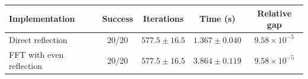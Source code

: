 \begin{tabular}{lcccc}\hline
Implementation & Success & Iterations & Time (s) & Relative gap \\
\hline
Direct reflection & 20/20 & $577.5 \pm 16.5$ & $1.367 \pm 0.040$ & $9.58\times10^{-5}$ \\
FFT with even reflection & 20/20 & $577.5 \pm 16.5$ & $3.864 \pm 0.119$ & $9.58\times10^{-5}$ \\
\hline\end{tabular}

